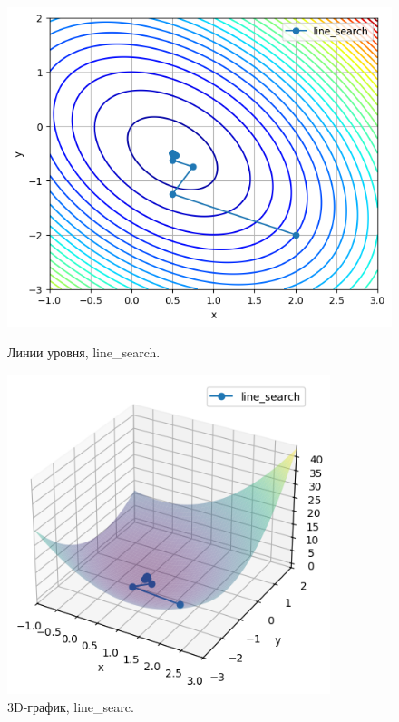 \documentclass[a4paper,12pt]{article}
\begin{document}
\begin{figure}[H]
    \begin{minipage}{0.49\textwidth}
        \centering \includegraphics[width=\textwidth]{images/task2/plot_levels_2_2_line_search.png}
        \caption{Линии уровня, line\_search.}
    \end{minipage}\hfill
    \begin{minipage}{0.49\textwidth}
        \centering \includegraphics[width=0.84\textwidth]{images/task2/plot_3d_2_2_line_search.png}
        \caption{3D-график, line\_searc.}
    \end{minipage} 
\end{figure}
\end{document}
